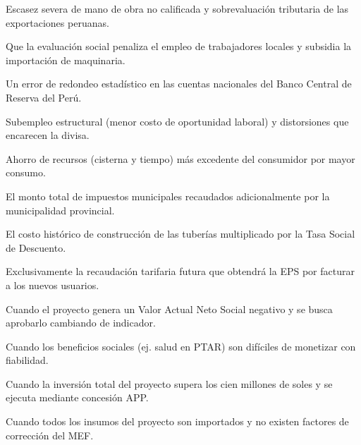 \begin{opts}
    \item Escasez severa de mano de obra no calificada y sobrevaluación tributaria de las exportaciones peruanas.
    \item Que la evaluación social penaliza el empleo de trabajadores locales y subsidia la importación de maquinaria.
    \item Un error de redondeo estadístico en las cuentas nacionales del Banco Central de Reserva del Perú.
    \item Subempleo estructural (menor costo de oportunidad laboral) y distorsiones que encarecen la divisa.
\end{opts}

\begin{opts}
    \item Ahorro de recursos (cisterna y tiempo) más excedente del consumidor por mayor consumo.
    \item El monto total de impuestos municipales recaudados adicionalmente por la municipalidad provincial.
    \item El costo histórico de construcción de las tuberías multiplicado por la Tasa Social de Descuento.
    \item Exclusivamente la recaudación tarifaria futura que obtendrá la EPS por facturar a los nuevos usuarios.
\end{opts}

\begin{opts}
    \item Cuando el proyecto genera un Valor Actual Neto Social negativo y se busca aprobarlo cambiando de indicador.
    \item Cuando los beneficios sociales (ej. salud en PTAR) son difíciles de monetizar con fiabilidad.
    \item Cuando la inversión total del proyecto supera los cien millones de soles y se ejecuta mediante concesión APP.
    \item Cuando todos los insumos del proyecto son importados y no existen factores de corrección del MEF.
\end{opts}


